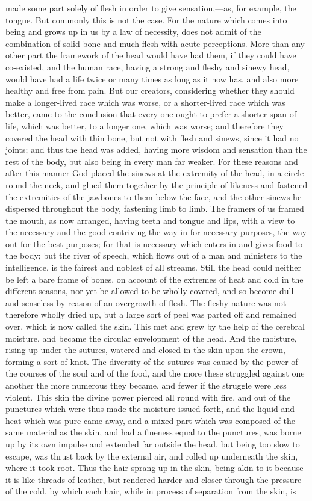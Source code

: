 \documentclass[12pt]{article}
\begin{document}
made some part solely of flesh in order to give sensation,---as, for example, the tongue. But commonly this is not the case. For the nature which comes into being and grows up in us by a law of necessity, does not admit of the combination of solid bone and much flesh with acute perceptions. More than any other part the framework of the head would have had them, if they could have co-existed, and the human race, having a strong and fleshy and sinewy head, would have had a life twice or many times as long as it now has, and also more healthy and free from pain. But our creators, considering whether they should make a longer-lived race which was worse, or a shorter-lived race which was better, came to the conclusion that every one ought to prefer a shorter span of life, which was better, to a longer one, which was worse; and therefore they covered the head with thin bone, but not with flesh and sinews, since it had no joints; and thus the head was added, having more wisdom and sensation than the rest of the body, but also being in every man far weaker. For these reasons and after this manner God placed the sinews at the extremity of the head, in a circle round the neck, and glued them together by the principle of likeness and fastened the extremities of the jawbones to them below the face, and the other sinews he dispersed throughout the body, fastening limb to limb. The framers of us framed the mouth, as now arranged, having teeth and tongue and lips, with a view to the necessary and the good contriving the way in for necessary purposes, the way out for the best purposes; for that is necessary which enters in and gives food to the body; but the river of speech, which flows out of a man and ministers to the intelligence, is the fairest and noblest of all streams. Still the head could neither be left a bare frame of bones, on account of the extremes of heat and cold in the different seasons, nor yet be allowed to be wholly covered, and so become dull and senseless by reason of an overgrowth of flesh. The fleshy nature was not therefore wholly dried up, but a large sort of peel was parted off and remained over, which is now called the skin. This met and grew by the help of the cerebral moisture, and became the circular envelopment of the head. And the moisture, rising up under the sutures, watered and closed in the skin upon the crown, forming a sort of knot. The diversity of the sutures was caused by the power of the courses of the soul and of the food, and the more these struggled against one another the more numerous they became, and fewer if the struggle were less violent. This skin the divine power pierced all round with fire, and out of the punctures which were thus made the moisture issued forth, and the liquid and heat which was pure came away, and a mixed part which was composed of the same material as the skin, and had a fineness equal to the punctures, was borne up by its own impulse and extended far outside the head, but being too slow to escape, was thrust back by the external air, and rolled up underneath the skin, where it took root. Thus the hair sprang up in the skin, being akin to it because it is like threads of leather, but rendered harder and closer through the pressure of the cold, by which each hair, while in process of separation from the skin, is 
\end{document}

